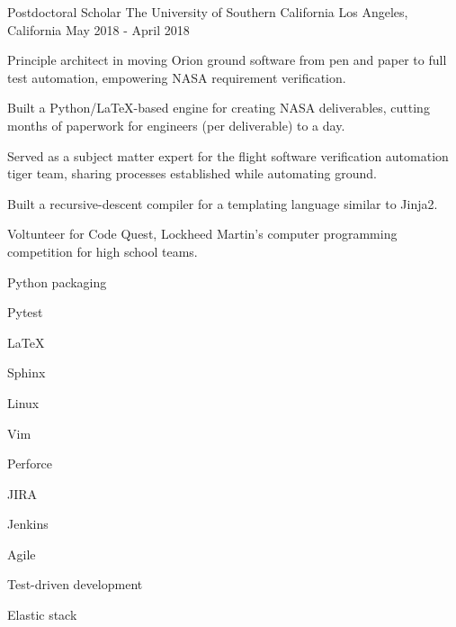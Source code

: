 \begin{cventries}
  \cventry%
    {Postdoctoral Scholar} %
    {The University of Southern California} %
    {Los Angeles, California} %
    {May 2018 \-- April 2018} %
    {%
      \begin{cvitems} %
        \item {Principle architect in moving Orion ground software from pen and paper to full test automation, empowering NASA requirement verification.}
        \item {Built a Python/LaTeX-based engine for creating NASA deliverables, cutting months of paperwork for engineers (per deliverable) to a day.}
        \item {Served as a subject matter expert for the flight software verification automation tiger team, sharing processes established while automating ground.}
        \item {Built a recursive-descent compiler for a templating language similar to Jinja2.}
        \item {Voltunteer for Code Quest, Lockheed Martin's computer programming competition for high school teams.}
      \end{cvitems}
    }
    \begin{cventryskills}
      \item Python packaging
      \item Pytest
      \item LaTeX
      \item Sphinx
      \item Linux
      \item Vim
      \item Perforce
      \item JIRA
      \item Jenkins
      \item Agile
      \item Test-driven development
      \item Elastic stack
    \end{cventryskills}


\end{cventries}
